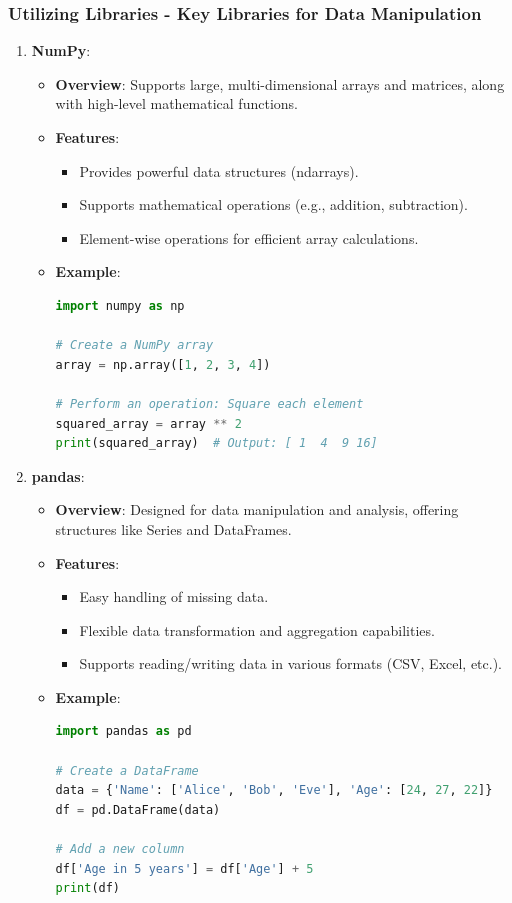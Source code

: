 \documentclass{beamer}
\begin{document}
\begin{frame}[fragile]
    \frametitle{Utilizing Libraries - Key Libraries for Data Manipulation}
    \begin{enumerate}
        \item \textbf{NumPy}:
        \begin{itemize}
            \item \textbf{Overview}: Supports large, multi-dimensional arrays and matrices, along with high-level mathematical functions.
            \item \textbf{Features}:
            \begin{itemize}
                \item Provides powerful data structures (ndarrays).
                \item Supports mathematical operations (e.g., addition, subtraction).
                \item Element-wise operations for efficient array calculations.
            \end{itemize}
            \item \textbf{Example}:
            \begin{lstlisting}[language=Python]
import numpy as np

# Create a NumPy array
array = np.array([1, 2, 3, 4])

# Perform an operation: Square each element
squared_array = array ** 2
print(squared_array)  # Output: [ 1  4  9 16]
            \end{lstlisting}
        \end{itemize}
        
        \item \textbf{pandas}:
        \begin{itemize}
            \item \textbf{Overview}: Designed for data manipulation and analysis, offering structures like Series and DataFrames.
            \item \textbf{Features}:
            \begin{itemize}
                \item Easy handling of missing data.
                \item Flexible data transformation and aggregation capabilities.
                \item Supports reading/writing data in various formats (CSV, Excel, etc.).
            \end{itemize}
            \item \textbf{Example}:
            \begin{lstlisting}[language=Python]
import pandas as pd

# Create a DataFrame
data = {'Name': ['Alice', 'Bob', 'Eve'], 'Age': [24, 27, 22]}
df = pd.DataFrame(data)

# Add a new column
df['Age in 5 years'] = df['Age'] + 5
print(df)
            \end{lstlisting}
        \end{itemize}
    \end{enumerate}
\end{frame}
\end{document}
